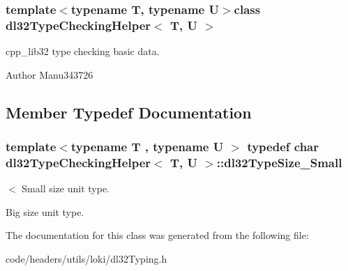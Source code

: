 \subsubsection*{template$<$typename T, typename U$>$class dl32\-Type\-Checking\-Helper$<$ T, U $>$}

cpp\-\_\-lib32 type checking basic data. 

\begin{DoxyAuthor}{Author}
Manu343726 
\end{DoxyAuthor}


\subsection{Member Typedef Documentation}
\hypertarget{classdl32_type_checking_helper_aaf5aef650f2cd1d9267758bb505134ba}{
\subsubsection[{dl32\-Type\-Size\-\_\-\-Small}]{\setlength{\rightskip}{0pt plus 5cm}template$<$typename T , typename U $>$ typedef char {\bf dl32\-Type\-Checking\-Helper}$<$ T, U $>$\-::{\bf dl32\-Type\-Size\-\_\-\-Small}}}\label{classdl32_type_checking_helper_aaf5aef650f2cd1d9267758bb505134ba}


$<$ Small size unit type. 

Big size unit type. 

The documentation for this class was generated from the following file\-:\begin{DoxyCompactItemize}
\item 
code/headers/utils/loki/dl32\-Typing.\-h\end{DoxyCompactItemize}
